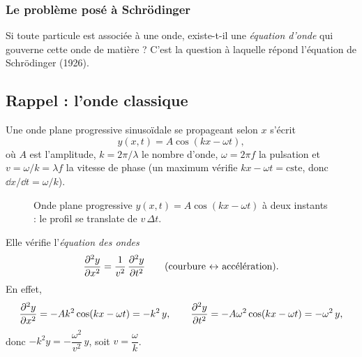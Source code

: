 \subsubsection{Le problème posé à Schrödinger}

Si toute particule est associée à une onde, existe-t-il une \emph{équation
d'onde} qui gouverne cette onde de matière ? C'est la question à laquelle
répond l'équation de Schrödinger (1926).

\subsection{Rappel : l'onde classique}\label{sec:onde}

Une onde plane progressive sinusoïdale se propageant selon $x$ s'écrit
\[
  y(x,t) = A\cos(kx - \omega t),
\]
où $A$ est l'amplitude, $k = 2\pi/\lambda$ le nombre d'onde, $\omega = 2\pi f$ la
pulsation et $v = \omega/k = \lambda f$ la vitesse de phase (un maximum vérifie
$kx-\omega t = \text{cste}$, donc $\dd x/\dd t = \omega/k$).

\begin{figure}[!ht]
\centering
{}
\caption{Onde plane progressive $y(x,t)=A\cos(kx-\omega t)$ à deux instants :
le profil se translate de $v\,\Delta t$.}
\end{figure}

Elle vérifie l'\emph{équation des ondes}
\[
  \dfrac{\partial^{2} y}{\partial x^{2}} = \frac{1}{v^2}\,\dfrac{\partial^{2} y}{\partial t^{2}}
  \qquad\text{(courbure $\leftrightarrow$ accélération).}
\]
En effet,
\[
  \dfrac{\partial^{2} y}{\partial x^{2}} = -Ak^2\cos(kx-\omega t) = -k^2\,y ,
  \qquad
  \dfrac{\partial^{2} y}{\partial t^{2}} = -A\omega^2\cos(kx-\omega t) = -\omega^2\,y ,
\]
donc $-k^2 y = -\dfrac{\omega^2}{v^2}\,y$, soit $v = \dfrac{\omega}{k}$.

